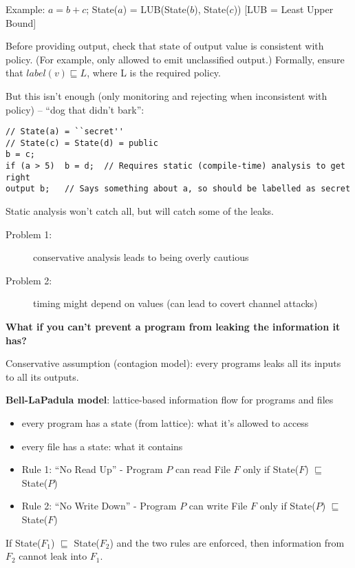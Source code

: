 Example: $a = b + c$; State($a$) = LUB(State($b$), State($c$))
[LUB = Least Upper Bound]

Before providing output, check that state of output value is consistent with
policy. (For example, only allowed to emit unclassified output.) Formally, ensure that $label(v) \sqsubseteq L$, where L is the required policy.

But this isn't enough (only monitoring and rejecting when inconsistent with
policy) -- ``dog that didn't bark'':
\begin{verbatim}
// State(a) = ``secret''
// State(c) = State(d) = public
b = c;
if (a > 5)  b = d;  // Requires static (compile-time) analysis to get right
output b;   // Says something about a, so should be labelled as secret
\end{verbatim}
Static analysis won't catch all, but will catch some of the leaks.
\begin{description}
    \item[Problem 1:] conservative analysis leads to being overly cautious
    \item[Problem 2:] timing might depend on values (can lead to covert channel attacks)
\end{description}

{\bf What if you can't prevent a program from leaking the information it has?}

Conservative assumption (contagion model): every programs leaks all its inputs to all its outputs. 

{\bf Bell-LaPadula model}: lattice-based information flow for programs and files
\begin{itemize}
\item every program has a state (from lattice): what it's allowed to access
\item every file has a state: what it contains
\item Rule 1: ``No Read Up'' - Program $P$ can read File $F$ only if State($F$)
    $\sqsubseteq$ State($P$)
\item Rule 2: ``No Write Down'' - Program $P$ can write File $F$ only if
    State($P$) $\sqsubseteq$ State($F$)
\end{itemize}
\begin{theorem*} If State($F_1$) $\sqsubseteq$ State($F_2$) and the two rules are
enforced, then information from $F_2$ cannot leak into $F_1$.
\end{theorem*}


